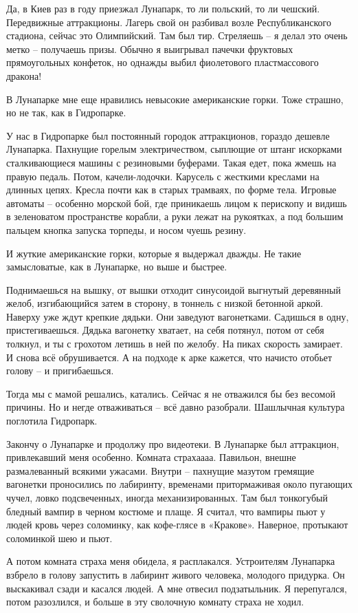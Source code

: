 Да, в Киев раз в году приезжал Лунапарк, то ли польский, то ли чешский. Передвижные аттракционы. Лагерь свой он разбивал возле Республиканского стадиона, сейчас это Олимпийский. Там был тир. Стреляешь – я делал это очень метко – получаешь призы. Обычно я выигрывал пачечки фруктовых прямоугольных конфеток, но однажды выбил фиолетового пластмассового дракона!

В Лунапарке мне еще нравились невысокие американские горки. Тоже страшно, но не так, как в Гидропарке.

У нас в Гидропарке был постоянный городок аттракционов, гораздо дешевле Лунапарка. Пахнущие горелым электричеством, сыплющие от штанг искорками сталкивающиеся машины с резиновыми буферами. Такая едет, пока жмешь на правую педаль. Потом, качели-лодочки. Карусель с жесткими креслами на длинных цепях. Кресла почти как в старых трамваях, по форме тела. Игровые автоматы – особенно морской бой, где приникаешь лицом к перископу и видишь в зеленоватом пространстве корабли, а руки лежат на рукоятках, а под большим пальцем кнопка запуска торпеды, и носом чуешь резину. 

И жуткие американские горки, которые я выдержал дважды. Не такие замысловатые, как в Лунапарке, но выше и быстрее.

Поднимаешься на вышку, от вышки отходит синусоидой выгнутый деревянный желоб, изгибающийся затем в сторону, в тоннель с низкой бетонной аркой. Наверху уже ждут крепкие дядьки. Они заведуют вагонетками. Садишься в одну, пристегиваешься. Дядька вагонетку хватает, на себя потянул, потом от себя толкнул, и ты с грохотом летишь в ней по желобу. На пиках скорость замирает. И снова всё обрушивается. А на подходе к арке кажется, что начисто отобьет голову – и пригибаешься.

Тогда мы с мамой решались, катались. Сейчас я не отважился бы без весомой причины. Но и негде отваживаться – всё давно разобрали. Шашлычная культура поглотила Гидропарк.

Закончу о Лунапарке и продолжу про видеотеки. В Лунапарке был аттракцион, привлекавший меня особенно. Комната страхаааа. Павильон, внешне размалеванный всякими ужасами. Внутри – пахнущие мазутом гремящие вагонетки проносились по лабиринту, временами притормаживая около пугающих чучел, ловко подсвеченных, иногда механизированных. Там был тонкогубый бледный вампир в черном костюме и плаще. Я считал, что вампиры пьют у людей кровь через соломинку, как кофе-глясе в «Кракове». Наверное, протыкают соломинкой шею и пьют.

А потом комната страха меня обидела, я расплакался. Устроителям Лунапарка взбрело в голову запустить в лабиринт живого человека, молодого придурка. Он выскакивал сзади и касался людей. А мне отвесил подзатыльник. Я перепугался, потом разозлился, и больше в эту сволочную комнату страха не ходил.

